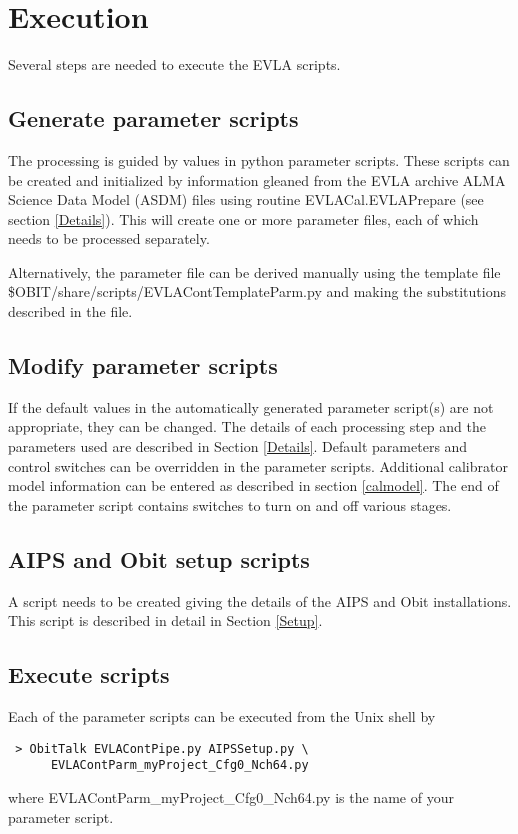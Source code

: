 \documentclass[11pt]{article}
\begin{document}
\section{Execution}
Several steps are needed to execute the EVLA scripts.
\subsection{Generate parameter scripts}
The processing is guided by values in python parameter scripts.
These scripts can be created and initialized by information gleaned from
the EVLA archive ALMA Science Data Model (ASDM) files using routine
EVLACal.EVLAPrepare (see section \ref{Details}).
This will create one or more parameter files, each of which needs to
be processed separately.

Alternatively, the parameter file can be derived manually using the
template file \$OBIT/share/scripts/EVLAContTemplateParm.py and making
the substitutions described in the file.

\subsection{Modify parameter scripts}
If the default values in the automatically generated parameter
script(s) are not appropriate, they can be changed.
The details of each processing step and the parameters used are
described in Section \ref{Details}.
Default parameters and control switches can be overridden in the
parameter scripts.
Additional calibrator model information can be entered as described in
section \ref{calmodel}.
The end of the parameter script contains switches to turn on and off
various stages.

\subsection{AIPS and Obit setup scripts}
A script needs to be created giving the details of the AIPS and Obit
installations. 
This script is described in detail in Section \ref{Setup}.

\subsection{Execute scripts}
Each of the parameter scripts can be executed from the Unix shell by
\begin{verbatim}
 > ObitTalk EVLAContPipe.py AIPSSetup.py \
      EVLAContParm_myProject_Cfg0_Nch64.py
\end{verbatim}
where EVLAContParm\_myProject\_Cfg0\_Nch64.py is the name of your
parameter script.
\end{document}

